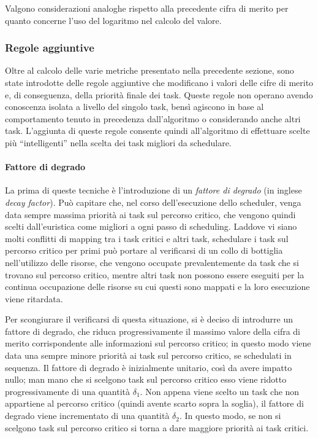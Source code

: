 Valgono considerazioni analoghe rispetto alla precedente cifra di merito 
per quanto concerne l'uso del logaritmo nel calcolo del valore.

\subsubsection{Regole aggiuntive}
Oltre al calcolo delle varie metriche presentato nella precedente sezione, sono 
state introdotte delle regole aggiuntive che modificano i valori delle cifre di 
merito e, di conseguenza, della priorità finale dei task. Queste regole non 
operano avendo conoscenza isolata a livello del singolo task, bensì agiscono in 
base al comportamento tenuto in precedenza dall'algoritmo o considerando anche 
altri task. L'aggiunta di queste regole consente quindi all'algoritmo di 
effettuare scelte più ``intelligenti'' nella scelta dei task migliori da 
schedulare.

\paragraph{Fattore di degrado}
La prima di queste tecniche è l'introduzione di un \emph{fattore di degrado} 
(in inglese \emph{decay factor}). Può capitare che, nel corso dell'esecuzione 
dello scheduler, venga data sempre massima priorità ai task sul percorso 
critico, che vengono quindi scelti dall'euristica come migliori a ogni passo di 
scheduling. Laddove vi siano molti conflitti di mapping tra i task critici
e altri task, schedulare i task sul percorso critico per primi
può portare al verificarsi di un collo di bottiglia nell'utilizzo delle 
risorse, che vengono occupate prevalentemente da task che si trovano sul 
percorso critico, mentre altri task non possono essere eseguiti per la continua 
occupazione delle risorse su cui questi sono mappati e la loro esecuzione viene
ritardata.

Per scongiurare il verificarsi di questa situazione, si è deciso di introdurre 
un fattore di degrado, che riduca progressivamente il massimo valore della 
cifra di merito corrispondente alle informazioni sul percorso critico; in 
questo modo viene data una sempre minore priorità ai task sul percorso critico,
se schedulati in sequenza. 
Il fattore di degrado è inizialmente unitario, così da avere impatto nullo; man 
mano che si scelgono task sul percorso critico esso viene ridotto 
progressivamente di una quantità $\delta_1$. Non appena viene scelto un 
task che non appartiene al percorso critico (quindi avente scarto sopra la 
soglia), il fattore di degrado viene incrementato di una quantità $\delta_2$. 
In questo modo, se non si scelgono task sul percorso critico si torna a dare 
maggiore priorità ai task critici.

